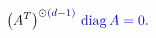 \documentclass[12pt]{article}
\begin{document}
\makeatletter
\renewcommand*{\@textcolor}[3]{%
  \protect\leavevmode
  \begingroup
    \color#1{#2}#3%
  \endgroup
}
\makeatother
\begin{displaymath}
\mathcolor[RGB]{0,0,15}{\left(} \mathcolor[RGB]{0,0,30}{A} ^ { \mathcolor[RGB]{0,0,45}{T} } \mathcolor[RGB]{0,0,60}{\right)} ^ { \mathcolor[RGB]{0,0,75}{\odot} \mathcolor[RGB]{0,0,90}{(} \mathcolor[RGB]{0,0,105}{d} \mathcolor[RGB]{0,0,120}{-} \mathcolor[RGB]{0,0,135}{1} \mathcolor[RGB]{0,0,150}{)} } \, \mathrm { \mathcolor[RGB]{0,0,165}{d} \mathcolor[RGB]{0,0,180}{i} \mathcolor[RGB]{0,0,195}{a} \mathcolor[RGB]{0,0,210}{g} } \, \mathcolor[RGB]{0,0,225}{A} \mathcolor[RGB]{0,0,240}{=} \mathcolor[RGB]{0,0,255}{0} \mathcolor[RGB]{0,15,0}{.}
\end{displaymath}
\end{document}
